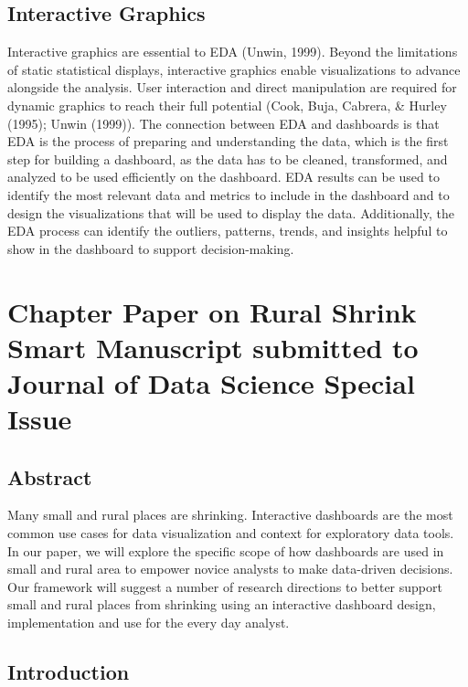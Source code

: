 \documentclass[print]{nuthesis}
\begin{document}
\hypertarget{interactive-graphics}{%
\section{Interactive Graphics}\label{interactive-graphics}}

Interactive graphics are essential to EDA (Unwin, 1999).
Beyond the limitations of static statistical displays, interactive graphics enable visualizations to advance alongside the analysis.
User interaction and direct manipulation are required for dynamic graphics to reach their full potential (Cook, Buja, Cabrera, \& Hurley (1995); Unwin (1999)).
The connection between EDA and dashboards is that EDA is the process of preparing and understanding the data, which is the first step for building a dashboard, as the data has to be cleaned, transformed, and analyzed to be used efficiently on the dashboard.
EDA results can be used to identify the most relevant data and metrics to include in the dashboard and to design the visualizations that will be used to display the data.
Additionally, the EDA process can identify the outliers, patterns, trends, and insights helpful to show in the dashboard to support decision-making.

\hypertarget{rmd-basics}{%
\chapter{Chapter Paper on Rural Shrink Smart Manuscript submitted to Journal of Data Science Special Issue}\label{rmd-basics}}

\hypertarget{abstract}{%
\section{Abstract}\label{abstract}}

Many small and rural places are shrinking. Interactive dashboards are the most common use cases for data visualization and context for exploratory data tools. In our paper, we will explore the specific scope of how dashboards are used in small and rural area to empower novice analysts to make data-driven decisions. Our framework will suggest a number of research directions to better support small and rural places from shrinking using an interactive dashboard design, implementation and use for the every day analyst.

\hypertarget{introduction-1}{%
\section{Introduction}\label{introduction-1}}
\end{document}
